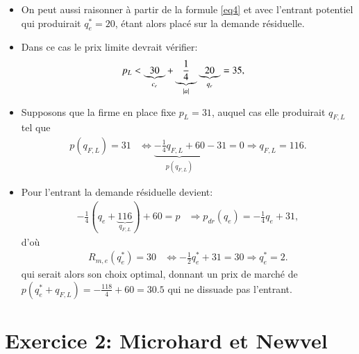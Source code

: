 \documentclass[notes, ignorenonframetext, compress, 9pt, xcolor=svgnames, aspectratio=169]{beamer}
\begin{document}
\begin{frame}
\begin{itemize}
    \begin{itemize}
    \item On peut aussi raisonner à partir de la formule \eqref{eq4} et avec l'entrant potentiel qui produirait $q_e^* = 20$, étant alors placé sur la demande résiduelle.
   \item Dans ce cas le prix limite devrait vérifier:
   \begin{align*}
p_L &< \underbrace{30}_{c_e} + \underbrace{\frac{1}{4}}_{\left\vert {a} \right\vert}\underbrace{20}_{q_e} = 35,
\end{align*}
   \item Supposons que la firme en place fixe $p_L = 31$, auquel cas elle produirait $q_{F,L}$ tel que 
   \begin{align*}
   p(q_{F,L}) = 31 &\Leftrightarrow \underbrace{-\frac{1}{4}q_{F,L} + 60}_{p(q_{F,L}) } - 31 = 0 \Rightarrow q_{F,L} = 116.
   \end{align*}
   \item Pour l'entrant la demande résiduelle devient:
   \begin{align*}
    -\frac{1}{4}(q_e + \underbrace{116}_{q_{F, L}}) + 60 = p &\Rightarrow p_{dr}(q_e) = -\frac{1}{4}q_e +31,
    \end{align*}
    d'où 
    \begin{align*}
    R_{m, e}(q_e^*) = 30 &\Leftrightarrow  -\frac{1}{2}q_e^* +31 = 30 \Rightarrow q_e^* = 2.
    \end{align*}
    qui serait alors son choix optimal, donnant un prix de marché de $p(q_e^* +  q_{F,L}) = -\frac{118}{4} + 60 = 30.5$ qui ne dissuade pas l'entrant.
    
    \end{itemize}
    \end{itemize}
    
\end{frame}  


    
\section{Exercice 2: Microhard et Newvel}
\frame{\sectionpage}
\end{document}

